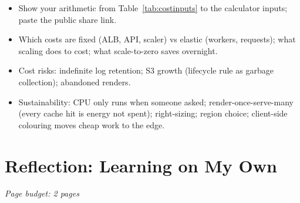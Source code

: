 \documentclass[a4paper,12pt]{article}
\newcommand{\budget}[1]{\hfill{\small\textcolor{mutedText}{\emph{Page budget: #1}}}\par}
\begin{document}
\begin{yourwriting}
\begin{itemize}
    \item Show your arithmetic from Table~\ref{tab:costinputs} to the calculator inputs; paste the public share link.
    \item Which costs are fixed (ALB, API, scaler) vs elastic (workers, requests); what scaling does to cost; what scale-to-zero saves overnight.
    \item Cost risks: indefinite log retention; S3 growth (lifecycle rule as garbage collection); abandoned renders.
    \item Sustainability: CPU only runs when someone asked; render-once-serve-many (every cache hit is energy not spent); right-sizing; region choice; client-side colouring moves cheap work to the edge.
\end{itemize}
\end{yourwriting}

\newpage
\section{Reflection: Learning on My Own}
\budget{2 pages}
\end{document}
